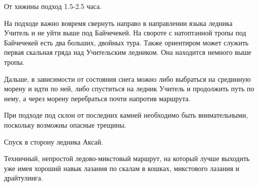 От хижины \geoLighthouse{} подход 1.5-2.5 часа.


На подходе важно вовремя свернуть направо в направлении языка ледника Учитель и не уйти выше под Байчечекей. На свороте с натоптанной тропы
под Байчечекей есть два больших, двойных тура. Также ориентиром может служить первая скальная гряда над Учительским ледником. Она находится
немного выше тропы.

Дальше, в зависимости от состояния снега можно либо выбраться на срединную морену и идти по ней, либо спуститься на ледник Учитель и
продолжить путь по нему, а через морену перебраться почти напротив маршрута.

При подходе под склон от последних камней необходимо быть внимательными, поскольку возможны опасные трещины.



Спуск в сторону ледника Аксай.

Техничный, непростой ледово-микстовый маршрут, на который лучше выходить уже имея хороший навык лазания по скалам в кошках, микстового
лазания и драйтулинга.
